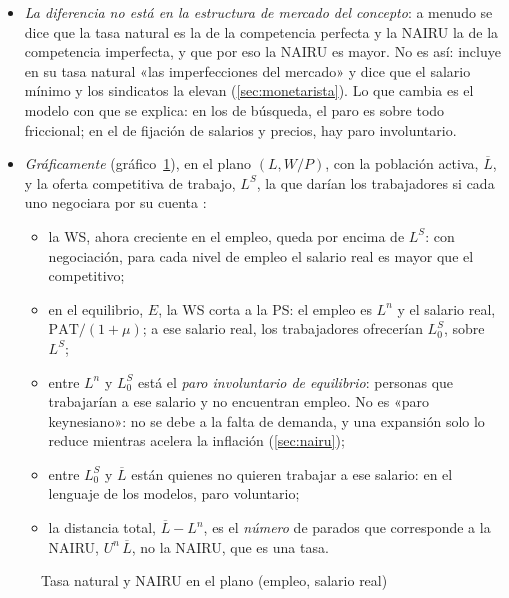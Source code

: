 \documentclass[11pt]{article}
\begin{document}
\begin{itemize}
\item \emph{La diferencia no está en la estructura de mercado del concepto}: a menudo se dice que la tasa natural es la de la competencia perfecta y la NAIRU la de la competencia imperfecta, y que por eso la NAIRU es mayor. No es así:  incluye en su tasa natural «las imperfecciones del mercado»\nocite{Friedman1968Role} y dice que el salario mínimo y los sindicatos la elevan (\ref{sec:monetarista}). Lo que cambia es el modelo con que se explica: en los de búsqueda, el paro es sobre todo friccional; en el de fijación de salarios y precios, hay paro involuntario.
\item \emph{Gráficamente} (gráfico~\ref{fig:tn-nairu}), en el plano $(L,W/P)$, con la población activa, $\overline L$, y la oferta competitiva de trabajo, $L^S$, la que darían los trabajadores si cada uno negociara por su cuenta :
  \begin{itemize}
  \item la WS, ahora creciente en el empleo, queda por encima de $L^S$: con negociación, para cada nivel de empleo el salario real es mayor que el competitivo;
  \item en el equilibrio, $E$, la WS corta a la PS: el empleo es $L^n$ y el salario real, $\mathrm{PAT}/(1+\mu)$; a ese salario real, los trabajadores ofrecerían $L^S_0$, sobre $L^S$;
  \item entre $L^n$ y $L^S_0$ está el \emph{paro involuntario de equilibrio}: personas que trabajarían a ese salario y no encuentran empleo. No es «paro keynesiano»: no se debe a la falta de demanda, y una expansión solo lo reduce mientras acelera la inflación (\ref{sec:nairu});
  \item entre $L^S_0$ y $\overline L$ están quienes no quieren trabajar a ese salario: en el lenguaje de los modelos, paro voluntario;
  \item la distancia total, $\overline L-L^n$, es el \emph{número} de parados que corresponde a la NAIRU, $U^n\,\overline L$, no la NAIRU, que es una tasa.
  \end{itemize}
\end{itemize}

\begin{figure}[H]
\centering
\caption{Tasa natural y NAIRU en el plano (empleo, salario real)}\label{fig:tn-nairu}
\end{figure}
\end{document}
